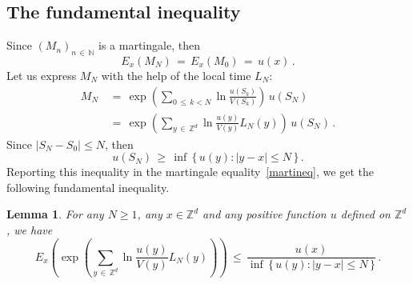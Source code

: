 \documentclass[10pt]{amsart}
\newtheorem{lemm}[theo]{Lemma}\newtheorem{prop}[theo]{Proposition}\newtheorem{coro}[theo]{Corollary}\newtheorem{conj}[theo]{Conjecture}
\theoremstyle{definition}\newtheorem{defi}[theo]{Definition}\newtheorem{rema}[theo]{Remark}\newtheorem{exam}[theo]{Example}\newtheorem{exem}[theo]{Example}\newtheorem{nota}[theo]{Notation}
\newcommand*\Zd {{\mathbb Z^d}}
\newcommand*\N {{\mathbb N}}
\renewcommand{\N}{\mathbb{N}}
\begin{document}
\subsection{The fundamental inequality}
Since $(M_n)_{n\,\in\,\N}$ is a martingale, then
\begin{equation}\label{martineq}
E_x(M_N)\,=\,E_x(M_0)\,=\,u(x)\,.
\end{equation}
Let us express $M_N$ with the help of the local time $L_N$:
\begin{align*}
M_N\, &=\,\exp\left(\sum_{0\,\leq\,k<N}\ln
\frac{u(S_k)}{V(S_k)}\right)\,u(S_N)\\ &=\,\exp\left(\sum_{y\,\in\,\Zd}\ln
\frac{u(y)}{V(y)}L_N(y)\right)\,u(S_N)
\,.
\end{align*}
Since $|S_N-S_0|\leq N$, then
\[
u(S_N)\,\geq\, \inf\,\{\,u(y):|y-x|\leq N\,\} \,.
\]
Reporting this inequality in the martingale equality~\eqref{martineq}, we get the following fundamental inequality.
\begin{lemm}\label{funine}
For any $N\geq 1$, any $x\in\Zd$ and any positive function $u$ defined on $\Zd$, we have
\[
E_x\left(\exp\left(\sum_{y\,\in\,\Zd}\ln
\frac{u(y)}{V(y)}L_N(y)\right)\right)\,\leq\,
\frac{u(x)}
{\inf\,\{\,u(y):|y-x|\leq N\,\}}\,.
\]
\end{lemm}
\end{document}
